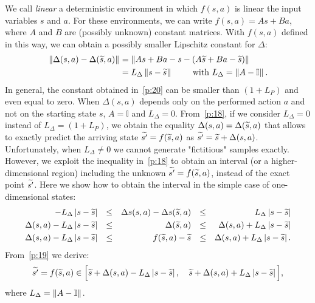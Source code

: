 We call \textit{linear} a deterministic environment in which $f(s, a)$ is linear \wrt the input variables $s$ and $a$. For these environments, we can write $f(s,a) = As + Ba$, where $A$ and $B$ are (possibly unknown) constant matrices. With $f(s,a)$ defined in this way, we can obtain a possibly smaller Lipschitz constant for $\Delta$:
\begin{align}
\left\|\Delta(s,a)-\Delta(\widetilde{s},a)\right\|_{} &= \left\|As+Ba-s - \left(A\widetilde{s}+Ba-\widetilde{s}\right)\right\|_{} \nonumber \\
&= L_{\Delta} \left\|s-\widetilde{s}\right\|_{} \qquad \text{ with } L_{\Delta}=\left\|A-\mathbb{I}\right\|_{}. \label{p:20}
\end{align}
In general, the constant obtained in~\eqref{p:20} can be smaller than $\left(1 + L_{P}\right)$ and even equal to zero. When $\Delta(s,a)$ depends only on the performed action $a$ and not on the starting state $s$,  $A=\mathbb{I}$ and $L_{\Delta}=0$. From~\eqref{p:18}, if we consider $L_{\Delta} = 0$ instead of $L_{\Delta} = \left(1 + L_{P}\right)$, we obtain the equality $\Delta(s,a) = \Delta(\widetilde{s}, a)$ that allows to exactly predict the arriving state $\widetilde{s'}=f(\widetilde{s}, a)$ as $\widetilde{s'} = \widetilde{s} + \Delta(s,a)$.\\
\newline
Unfortunately, when $L_{\Delta} \neq 0$ we cannot generate "fictitious" samples exactly. However, we exploit the inequality in~\eqref{p:18} to obtain an interval (or a higher-dimensional region) including the unknown $\widetilde{s'}=f(\widetilde{s},a)$, instead of the exact point $\widetilde{s'}$. Here we show how to obtain the interval in the simple case of one-dimensional states:
\begin{align}
-L_{\Delta} \left|s - \wt{s}\right| &&\leq&& \Delta s (s,a) - \Delta s (\wt{s},a) &&\leq&& L_{\Delta} \left|s - \wt{s}\right| \nonumber\\
%
\Delta(s,a) - L_{\Delta} \left|s - \wt{s}\right| &&\leq&& \Delta(\wt{s},a) &&\leq&& \Delta(s,a) + L_{\Delta} \left|s - \wt{s}\right| \nonumber\\
%
\Delta(s,a) - L_{\Delta} \left|s - \wt{s}\right| &&\leq&& f(\wt{s},a) - \wt{s} &&\leq&& \Delta(s,a) + L_{\Delta} \left|s - \wt{s}\right|. \label{p:19}
\end{align}
From~\eqref{p:19} we derive:
\begin{align}
	\widetilde{s'}=f(\widetilde{s}, a) \in \Big[\widetilde{s} + \Delta(s,a) - L_{\Delta} \left|s - \widetilde{s}\right|, \quad \widetilde{s} + \Delta(s,a) + L_{\Delta} \left|s - \widetilde{s}\right|\Big],
\end{align}
where $L_{\Delta} = \left\|A - \mathbb{I}\right\|_{}$.
